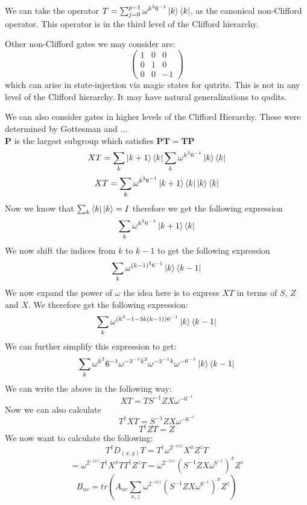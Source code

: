 \documentclass{article}
\begin{document}
We can take the operator $T = \sum_{j=0}^{p-1} \omega^{k^36^{-1}} \ket{k}\bra{k}$, as the canonical non-Clifford operator. This operator is in the third level of the Clifford hierarchy.

Other non-Clifford gates we may consider are:
\begin{equation}
    \begin{pmatrix}
    1 & 0 & 0 \\
    0 & 1 & 0 \\
    0 & 0 & -1 
    \end{pmatrix}
\end{equation}
which can arise in state-injection via magic states for qutrits. This is not in any level of the Clifford hierarchy. It may have natural generalizations to qudits.

We can also consider gates in higher levels of the Clifford Hierarchy. These were determined by Gottesman and ...\\

$\mathbf{P}$ is the largest subgroup which satisfies $\mathbf{PT}=\mathbf{TP}$
\[
XT=\sum_{k}\ket{k+1}\bra{k}\sum_{k}\omega^{k^{3}6^{-1}}\ket{k}\bra{k}
\]
\[
XT=\sum_{k}\omega^{k^{3}6^{-1}}\ket{k+1}\bra{k}\ket{k}\bra{k}
\]
Now we know that $\sum_{k}\bra{k}\ket{k}=I$ therefore we get the following expression
\[
\sum_{k}\omega^{k^{3}6^{-1}}\ket{k+1}\bra{k}
\]
We now shift the indices from $k$ to $k-1$ to get the following expression
\[
\sum_{k}\omega^{(k-1)^{3}6^{-1}}\ket{k}\bra{k-1}
\]
We now expand the power of $\omega$ the idea here is to express $XT$ in terms of $S$, $Z$ and $X$. We therefore get the following expression:
\[
\sum_{k}\omega^{(k^{3}-1-3k(k-1))6^{-1}}\ket{k}\bra{k-1}
\]
We can further simplify this expression to get:
\[
\sum_{k}\omega^{k^{3}}6^{-1}\omega^{-2^{-1}k^{2}}\omega^{-2^{-1}k}\omega^{-6^{-1}}\ket{k}\bra{k-1}
\]
We can write the above in the following way:
\begin{equation}
XT=TS^{-1}ZX\omega^{-6^{-1}}
\end{equation}
Now we can also calculate
\[
T^{\dagger}XT=S^{-1}ZX\omega^{-6^{-1}}
\]
\[
T^{\dagger}ZT=Z
\]
We now want to calculate the following:
\[
T^{\dagger}D_{(x,y)}T=T^{\dagger}\omega^{2^{-1xz}}X^{x}Z^{z}T
\]
\[=
\omega^{2^{-1xz}}T^{\dagger}X^{x}TT^{\dagger}Z^{z}T=\omega^{2^{-1xz}}(S^{-1}ZX\omega^{6^{-1}})^{x}Z^{z}
\]
\[
B_{uv}=tr(A_{uv}\sum_{x,z}\omega^{2^{-1xz}}(S^{-1}ZX\omega^{6^{-1}})^{x}Z^{z})
\]
\end{document}
